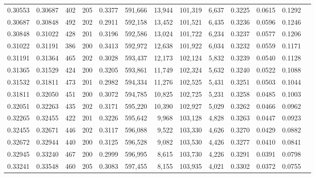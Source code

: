 \begin{tabular}{rrrrrrrrrrrrr}
0.30553 & 0.30687 &   402 & 205 &                                     0.3377 & 591,666 &  13,944 & 101,319 &   6,637 & 0.3225 & 0.0615 & 0.1292 \\
0.30687 & 0.30848 &   492 & 202 &                                     0.2911 & 592,158 &  13,452 & 101,521 &   6,435 & 0.3236 & 0.0596 & 0.1246 \\
0.30848 & 0.31022 &   428 & 201 &                                     0.3196 & 592,586 &  13,024 & 101,722 &   6,234 & 0.3237 & 0.0577 & 0.1206 \\
0.31022 & 0.31191 &   386 & 200 &                                     0.3413 & 592,972 &  12,638 & 101,922 &   6,034 & 0.3232 & 0.0559 & 0.1171 \\
0.31191 & 0.31364 &   465 & 202 &                                     0.3028 & 593,437 &  12,173 & 102,124 &   5,832 & 0.3239 & 0.0540 & 0.1128 \\
0.31365 & 0.31529 &   424 & 200 &                                     0.3205 & 593,861 &  11,749 & 102,324 &   5,632 & 0.3240 & 0.0522 & 0.1088 \\
0.31532 & 0.31811 &   473 & 201 &                                     0.2982 & 594,334 &  11,276 & 102,525 &   5,431 & 0.3251 & 0.0503 & 0.1044 \\
0.31811 & 0.32050 &   451 & 200 &                                     0.3072 & 594,785 &  10,825 & 102,725 &   5,231 & 0.3258 & 0.0485 & 0.1003 \\
0.32051 & 0.32263 &   435 & 202 &                                     0.3171 & 595,220 &  10,390 & 102,927 &   5,029 & 0.3262 & 0.0466 & 0.0962 \\
0.32265 & 0.32455 &   422 & 201 &                                     0.3226 & 595,642 &   9,968 & 103,128 &   4,828 & 0.3263 & 0.0447 & 0.0923 \\
0.32455 & 0.32671 &   446 & 202 &                                     0.3117 & 596,088 &   9,522 & 103,330 &   4,626 & 0.3270 & 0.0429 & 0.0882 \\
0.32672 & 0.32944 &   440 & 200 &                                     0.3125 & 596,528 &   9,082 & 103,530 &   4,426 & 0.3277 & 0.0410 & 0.0841 \\
0.32945 & 0.33240 &   467 & 200 &                                     0.2999 & 596,995 &   8,615 & 103,730 &   4,226 & 0.3291 & 0.0391 & 0.0798 \\
0.33241 & 0.33548 &   460 & 205 &                                     0.3083 & 597,455 &   8,155 & 103,935 &   4,021 & 0.3302 & 0.0372 & 0.0755 \\

\end{tabular}
